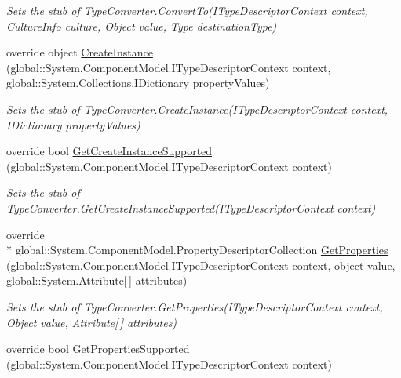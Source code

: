 \begin{DoxyCompactItemize}
\begin{DoxyCompactList}\small\item\em Sets the stub of Type\-Converter.\-Convert\-To(\-I\-Type\-Descriptor\-Context context, Culture\-Info culture, Object value, Type destination\-Type)\end{DoxyCompactList}\item 
override object \hyperlink{class_system_1_1_component_model_1_1_fakes_1_1_stub_boolean_converter_a01122a34af7659748e04ea9efdc8ac8e}{Create\-Instance} (global\-::\-System.\-Component\-Model.\-I\-Type\-Descriptor\-Context context, global\-::\-System.\-Collections.\-I\-Dictionary property\-Values)
\begin{DoxyCompactList}\small\item\em Sets the stub of Type\-Converter.\-Create\-Instance(\-I\-Type\-Descriptor\-Context context, I\-Dictionary property\-Values)\end{DoxyCompactList}\item 
override bool \hyperlink{class_system_1_1_component_model_1_1_fakes_1_1_stub_boolean_converter_aa78538bdad745e18bb7e436f03c66d47}{Get\-Create\-Instance\-Supported} (global\-::\-System.\-Component\-Model.\-I\-Type\-Descriptor\-Context context)
\begin{DoxyCompactList}\small\item\em Sets the stub of Type\-Converter.\-Get\-Create\-Instance\-Supported(\-I\-Type\-Descriptor\-Context context)\end{DoxyCompactList}\item 
override \\*
global\-::\-System.\-Component\-Model.\-Property\-Descriptor\-Collection \hyperlink{class_system_1_1_component_model_1_1_fakes_1_1_stub_boolean_converter_aeef08a7eeb2b4d3c537e8e192533d90c}{Get\-Properties} (global\-::\-System.\-Component\-Model.\-I\-Type\-Descriptor\-Context context, object value, global\-::\-System.\-Attribute\mbox{[}$\,$\mbox{]} attributes)
\begin{DoxyCompactList}\small\item\em Sets the stub of Type\-Converter.\-Get\-Properties(\-I\-Type\-Descriptor\-Context context, Object value, Attribute\mbox{[}$\,$\mbox{]} attributes)\end{DoxyCompactList}\item 
override bool \hyperlink{class_system_1_1_component_model_1_1_fakes_1_1_stub_boolean_converter_a7f555cf6cd3cc15f48a455742321ebdb}{Get\-Properties\-Supported} (global\-::\-System.\-Component\-Model.\-I\-Type\-Descriptor\-Context context)

\end{DoxyCompactItemize}
